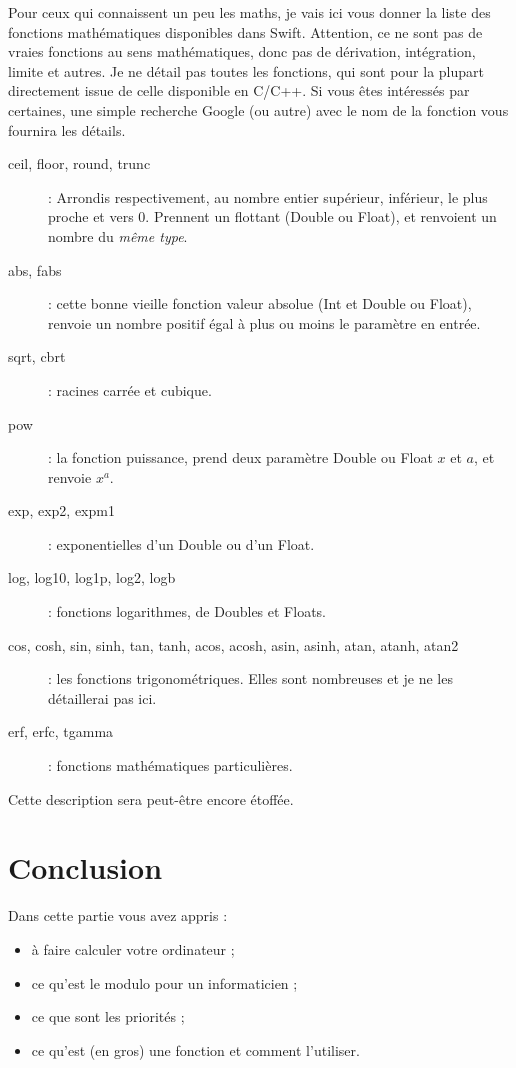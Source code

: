 Pour ceux qui connaissent un peu les maths, je vais ici vous donner la liste des fonctions mathématiques disponibles dans Swift. Attention, ce ne sont pas de vraies fonctions au sens mathématiques, donc pas de dérivation, intégration, limite et autres.
Je ne détail pas toutes les fonctions, qui sont pour la plupart directement issue de celle disponible en C/C++.
Si vous êtes intéressés par certaines, une simple recherche Google (ou autre) avec le nom de la fonction vous fournira les détails.
\begin{description}
\item[ceil, floor, round, trunc]
: Arrondis respectivement, au nombre entier supérieur, inférieur, le plus proche et vers 0. Prennent un flottant (Double ou Float), et renvoient un nombre du \emph{même type}.
\item[abs, fabs]
: cette bonne vieille fonction valeur absolue (Int et Double ou Float), renvoie un nombre positif égal à plus ou moins le paramètre en entrée.
\item[sqrt, cbrt]
: racines carrée et cubique.
\item[pow]
: la fonction puissance, prend deux paramètre Double ou Float $x$ et $a$, et renvoie $x^{a}$. %
\item[exp, exp2, expm1]
: exponentielles d'un Double ou d'un Float.
\item[log, log10, log1p, log2, logb]
: fonctions logarithmes, de Doubles et Floats.
\item[cos, cosh, sin, sinh, tan, tanh, acos, acosh, asin, asinh, atan, atanh, atan2]
: les fonctions trigonométriques. Elles sont nombreuses et je ne les détaillerai pas ici.
\item[erf, erfc, tgamma]
: fonctions mathématiques particulières.
\end{description}
Cette description sera peut-être encore étoffée.
\section*{Conclusion}
{}
Dans cette partie vous avez appris :
\begin{itemize}
\item à faire calculer votre ordinateur ;
\item ce qu'est le modulo pour un informaticien ;
\item ce que sont les priorités ;
\item ce qu'est (en gros) une fonction et comment l'utiliser.
\end{itemize}

